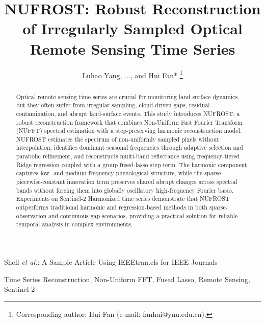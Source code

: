 \documentclass[letterpaper,journal]{IEEEtran}
\begin{document}
\title{NUFROST: Robust Reconstruction of Irregularly Sampled Optical Remote Sensing Time Series}

\author{Luhao Yang, ..., and Hui Fan*%
\thanks{Corresponding author: Hui Fan (e-mail: fanhui@ynu.edu.cn).}%
}

%
{Shell \MakeLowercase{\textit{et al.}}: A Sample Article Using IEEEtran.cls for IEEE Journals}


\maketitle

\begin{abstract}
Optical remote sensing time series are crucial for monitoring land surface dynamics, but they often suffer from irregular sampling, cloud-driven gaps, residual contamination, and abrupt land-surface events. This study introduces NUFROST, a robust reconstruction framework that combines Non-Uniform Fast Fourier Transform (NUFFT) spectral estimation with a step-preserving harmonic reconstruction model. NUFROST estimates the spectrum of non-uniformly sampled pixels without interpolation, identifies dominant seasonal frequencies through adaptive selection and parabolic refinement, and reconstructs multi-band reflectance using frequency-tiered Ridge regression coupled with a group fused-lasso step term. The harmonic component captures low- and medium-frequency phenological structure, while the sparse piecewise-constant innovation term preserves shared abrupt changes across spectral bands without forcing them into globally oscillatory high-frequency Fourier bases. Experiments on Sentinel-2 Harmonized time series demonstrate that NUFROST outperforms traditional harmonic and regression-based methods in both sparse-observation and continuous-gap scenarios, providing a practical solution for reliable temporal analysis in complex environments.
\end{abstract}

\begin{IEEEkeywords}
Time Series Reconstruction, Non-Uniform FFT, Fused Lasso, Remote Sensing, Sentinel-2
\end{IEEEkeywords}
\end{document}
